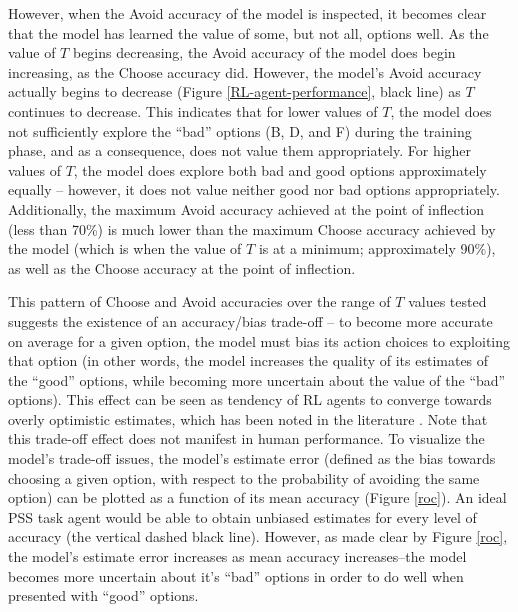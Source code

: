 \documentclass[10pt,letterpaper]{article}
\begin{document}
However, when the Avoid accuracy of the model is inspected, it becomes clear that the model has learned the value of some, but not all, options well. As the value of $T$ begins {\color{red} decreasing}, the Avoid accuracy of the model does begin {\color{red} increasing}, as the Choose accuracy did. However, the model's Avoid accuracy actually begins to decrease (Figure \ref{RL-agent-performance}, black line) as $T$ continues to {\color{red} decrease}. This indicates that for lower values of $T$, the model does not sufficiently explore the ``bad'' options (B, D, and F) during the training phase, and as a consequence, does not value them appropriately. For higher values of $T$, the model does explore both bad and good options approximately equally -- however, it does not value neither good nor bad options appropriately. Additionally, the maximum Avoid accuracy achieved at the point of inflection (less than 70\%) is much lower than the maximum Choose accuracy achieved by the model (which is when the value of $T$ is at a minimum; approximately 90\%), as well as the Choose accuracy at the point of inflection. 

This pattern of Choose and Avoid accuracies over the range of $T$ values tested suggests the existence of an accuracy/bias trade-off -- to become more accurate on average for a given option, the model must bias its action choices to exploiting that option (in other words, the model increases the quality of its estimates of the ``good'' options, while becoming more uncertain about the value of the ``bad'' options). This effect can be seen as tendency of RL agents to converge towards overly optimistic estimates, which has been noted in the literature \cite{hasselt2010double}. Note that this trade-off effect does not manifest in human performance. To visualize the model's trade-off issues, the model's estimate error (defined as the bias towards choosing a given option, with respect to the probability of avoiding the same option) can be plotted as a function of its mean accuracy (Figure \ref{roc}). An ideal PSS task agent would be able to obtain unbiased estimates for every level of accuracy (the vertical dashed black line). However, as made clear by Figure \ref{roc}, the model's estimate error increases as mean accuracy increases--the model becomes more uncertain about it’s ``bad'' options in order to do well when presented with ``good'' options.
\end{document}
